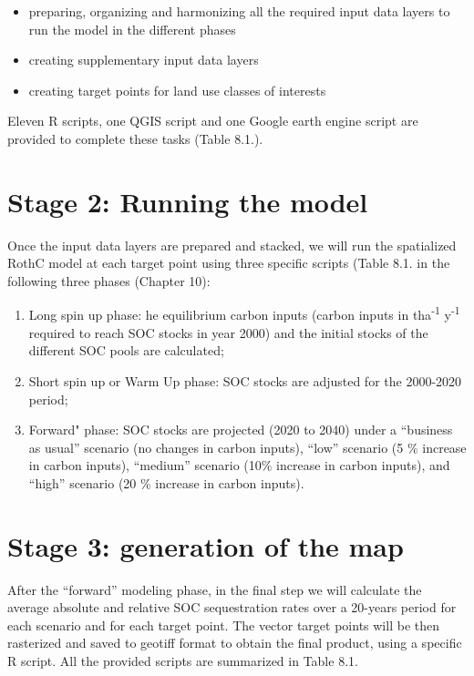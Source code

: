 \documentclass[
  10pt,
  b5paper,
]{book}
\providecommand{\tightlist}{%
  \setlength{\itemsep}{0pt}\setlength{\parskip}{0pt}}
\begin{document}
\begin{itemize}
\tightlist
\item
  preparing, organizing and harmonizing all the required input data layers to run the model in the different phases
\item
  creating supplementary input data layers
\item
  creating target points for land use classes of interests
\end{itemize}

Eleven R scripts, one QGIS script and one Google earth engine script are provided to complete these tasks (Table 8.1.).

\hypertarget{stage-2-running-the-model}{%
\section{Stage 2: Running the model}\label{stage-2-running-the-model}}

Once the input data layers are prepared and stacked, we will run the spatialized RothC model at each target point using three specific scripts (Table 8.1. in the following three phases (Chapter 10):

\begin{enumerate}
\def\labelenumi{\arabic{enumi}.}
\tightlist
\item
  Long spin up phase: he equilibrium carbon inputs (carbon inputs in tha\textsuperscript{-1} y\textsuperscript{-1} required to reach SOC stocks in year 2000) and the initial stocks of the different SOC pools are calculated;
\item
  Short spin up or Warm Up phase: SOC stocks are adjusted for the 2000-2020 period;
\item
  Forward" phase: SOC stocks are projected (2020 to 2040) under a ``business as usual'' scenario (no changes in carbon inputs), ``low'' scenario (5 \(\%\) increase in carbon inputs), ``medium'' scenario (10\(\%\) increase in carbon inputs), and ``high'' scenario (20 \(\%\) increase in carbon inputs).
\end{enumerate}

\hypertarget{stage-3-generation-of-the-map}{%
\section{Stage 3: generation of the map}\label{stage-3-generation-of-the-map}}

After the ``forward'' modeling phase, in the final step we will calculate the average absolute and relative SOC sequestration rates over a 20-years period for each scenario and for each target point. The vector target points will be then rasterized and saved to geotiff format to obtain the final product, using a specific R script. All the provided scripts are summarized in Table 8.1.
\end{document}
